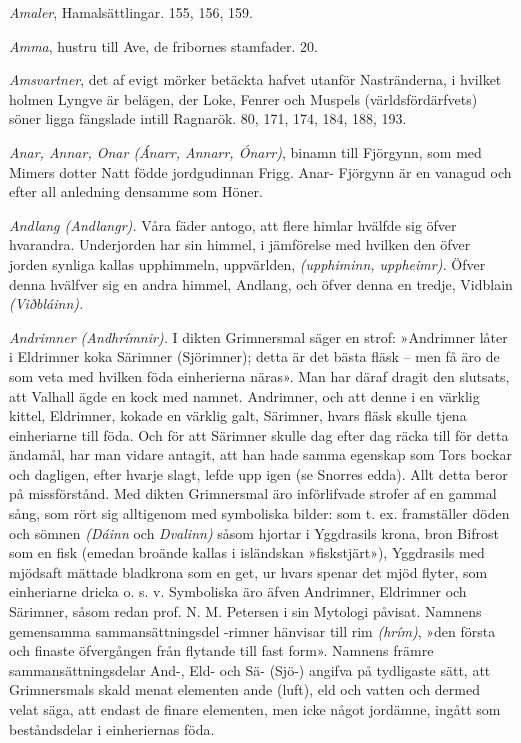 \emph{Amaler}, Hamalsättlingar. 155, 156, 159.

\emph{Amma}, hustru till Ave, de fribornes stamfader. 20.

\emph{Amsvartner}, det af evigt mörker betäckta hafvet utanför
Nastränderna, i hvilket holmen Lyngve är belägen, der Loke, Fenrer och
Muspels (världsfördärfvets) söner ligga fängslade intill Ragnarök. 80,
171, 174, 184, 188, 193.

\emph{Anar, Annar, Onar (Ánarr, Annarr, Ónarr)}, binamn till Fjörgynn,
som med Mimers dotter Natt födde jordgudinnan Frigg. Anar- Fjörgynn är
en vanagud och efter all anledning densamme som Höner.

\emph{Andlang (Andlangr).} Våra fäder antogo, att flere himlar hvälfde
sig öfver hvarandra. Underjorden har sin himmel, i jämförelse med
hvilken den öfver jorden synliga kallas upphimmeln, uppvärlden,
\emph{(upphiminn, uppheimr).} Öfver denna hvälfver sig en andra himmel,
Andlang, och öfver denna en tredje, Vidblain \emph{(Viðbláinn).}

\emph{Andrimner (Andhrímnir).} I dikten Grimnersmal säger en strof:
\protect\hypertarget{lb1625905.xhtmlux5cux23start201}{}{}\protect\hypertarget{lb1625905.xhtmlux5cux23start201-a}{}{}\protect\hypertarget{lb1625905.xhtmlux5cux23start201-b}{}{}\protect\hypertarget{lb1625905.xhtmlux5cux23start201-c}{}{}\protect\hypertarget{lb1625905.xhtmlux5cux23start201-d}{}{}
»Andrimner låter i Eldrimner koka Särimner (Sjörimner); detta är det
bästa fläsk -- men få äro de som veta med hvilken föda einherierna
näras». Man har däraf dragit den slutsats, att Valhall ägde en kock med
namnet. Andrimner, och att denne i en värklig kittel, Eldrimner, kokade
en värklig galt, Särimner, hvars fläsk skulle tjena einheriarne till
föda. Och för att Särimner skulle dag efter dag räcka till för detta
ändamål, har man vidare antagit, att han hade samma egenskap som Tors
bockar och dagligen, efter hvarje slagt, lefde upp igen (se Snorres
edda). Allt detta beror på missförstånd. Med dikten Grimnersmal äro
införlifvade strofer af en gammal sång, som rört sig alltigenom med
symboliska bilder: som t. ex. framställer döden och sömnen \emph{(Dáinn}
och \emph{Dvalinn)} såsom hjortar i Yggdrasils krona, bron Bifrost som
en fisk (emedan broände kallas i isländskan »fiskstjärt»), Yggdrasils
med mjödsaft mättade bladkrona som en get, ur hvars spenar det mjöd
flyter, som einheriarne dricka o. s. v. Symboliska äro äfven Andrimner,
Eldrimner och Särimner, såsom redan prof. N. M. Petersen i sin Mytologi
påvisat. Namnens gemensamma sammansättningsdel -rimner hänvisar till rim
\emph{(hrím)}, »den första och finaste öfvergången från flytande till
fast form». Namnens främre sammansättningsdelar And-, Eld- och Sä-
(Sjö-) angifva på tydligaste sätt, att Grimnersmals skald menat
elementen ande (luft), eld och vatten och dermed velat säga, att endast
de finare elementen, men icke något jordämne, ingått som beståndsdelar i
einheriernas föda.

